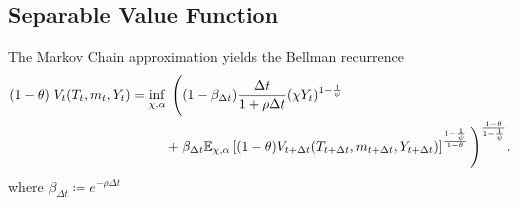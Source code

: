 \documentclass[../../main.tex]{subfiles}
\begin{document}
\subsection{Separable Value Function}

The Markov Chain approximation yields the Bellman recurrence \begin{equation}
    \begin{split}
        (1 - \theta) \; V_{t}(T_t, m_t, Y_t) = \inf_{\chi, \alpha} \; \Bigg(&(1 - \beta_{\Delta t} )\frac{\Delta t}{1 + \rho \Delta t}  (\chi Y_t)^{1 - \frac{1}{\psi}} \\
        + \; &\beta_{\Delta t}  \mathbb{E}_{\chi, \alpha} \left[(1 - \theta)V_{t + \Delta t}(T_{t + \Delta t}, m_{t + \Delta t}, Y_{t + \Delta t})  \right]^{\frac{1 - \frac{1}{\psi}}{1 - \theta}} \Bigg)^{\frac{1 - \theta}{1 - \frac{1}{\psi}}}.
    \end{split}
\end{equation} where $\beta_{\Delta t} \coloneqq e^{-\rho \Delta t}$%
\end{document}
